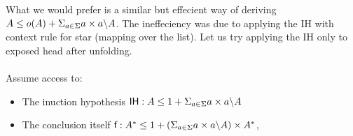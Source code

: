 \documentclass[a4paper,UKenglish,cleveref, autoref, thm-restate]{lipics-v2021}
\begin{document}
What we would prefer is a similar but effecient way of deriving $A \leq o(A) + \Sigma_{a \in \Sigma} a\times a \backslash A$. The ineffeciency was due to applying the IH with context rule for star (mapping over the list). Let us try applying the IH only to exposed head after unfolding.\\\\
Assume access to:
\begin{itemize}
\item The inuction hypothesis $ \textsf{IH} : A \leq 1 + \Sigma_{a \in \Sigma} a\times a \backslash A$
\item The conclusion itself $\textsf{f} : A^* \leq 1 + (\Sigma_{a \in \Sigma} a\times a \backslash A) \times A^*$,
\end{itemize}
\end{document}
